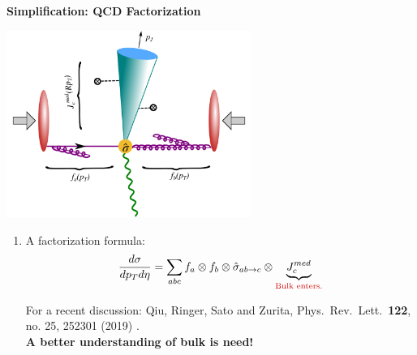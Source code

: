 \documentclass[9pt,a4paper,unknownkeysallowed,xcolor=dvipsnames,aspectratio=43]{beamer}
\begin{document}
%
%
\begin{frame}{\bf\huge Simplification: QCD Factorization}	\vspace{4mm}
\begin{center}
\includegraphics[width=0.6\textwidth]{fig/facotrization}\\
\end{center}
\begin{enumerate}
\item{A factorization formula:}
\begin{align}
    \frac{d\sigma}{dp_{T} d\eta} =\sum\limits_{abc}f_a\otimes f_b \otimes \hat{\sigma}_{ab\to c}\otimes \underbrace{J_c^{med}}_{\text{\color{darkred}Bulk enters.}}\notag
\end{align}
\begin{center}
{\tiny  For a recent discussion: {\color{teablue}
  Qiu, Ringer, Sato and Zurita,
  Phys.\ Rev.\ Lett.\  {\bf 122}, no. 25, 252301 (2019)
  .
  }}\\
  \vspace{2mm}
 {\color{darkred}\bf A better understanding of bulk is need!
 }
\end{center}
\end{enumerate}
\end{frame}
\end{document}
